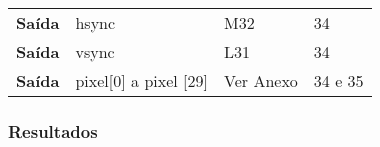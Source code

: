\begin{table}[h!]
\begin{tabular}{rlll}
		\multicolumn{1}{r|}{\textbf{Saída}}   & hsync                                  & M32                                      & 34                                         \\
		\multicolumn{1}{r|}{\textbf{Saída}}   & vsync                                  & L31                                      & 34                                         \\
		\multicolumn{1}{r|}{\textbf{Saída}}   & pixel{[}0{]} a pixel {[}29{]}          & Ver Anexo                                & 34 e 35                                    \\ \hline
	\end{tabular}
\end{table}





\subsubsection{Resultados} \label{subsub:serial_planEresults}
